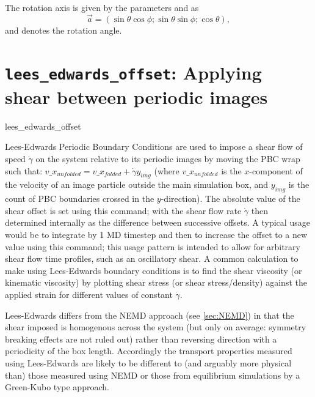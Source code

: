 The rotation axis is given by the parameters  and  as
\begin{equation}
\vec{a} = (\sin \theta \cos \phi ; \sin \theta \sin \phi ; \cos \theta),
\end{equation}
and  denotes the rotation angle.


\section{\texttt{lees_edwards_offset}: Applying shear between periodic images}
\label{sec:lees-edwards}


\begin{essyntax}
   lees_edwards_offset   
  \begin{features}
  \end{features}

\end{essyntax}

Lees-Edwards Periodic Boundary Conditions are used to impose a shear flow of speed $\dot{\gamma}$ on the system relative to its periodic images by moving the PBC wrap such that:  $v\_x_{unfolded} =  v\_x_{folded} + \dot{\gamma} y_{img}$ (where $v\_x_{unfolded}$ is the $x$-component of the velocity of an image particle outside the main simulation box, and $y_{img}$ is the count of PBC boundaries crossed in the $y$-direction).  
The absolute value of the shear offset is set using this command; with the shear flow rate $\dot{\gamma}$ then determined internally as the difference between successive offsets.  
A typical usage would be to integrate by 1 {MD} timestep and then to increase the offset to a new value using this command; this usage pattern is intended to allow for arbitrary shear flow time profiles, such as an oscillatory shear.  
A common calculation to make using Lees-Edwards boundary conditions is to find the shear viscosity (or kinematic viscosity) by plotting shear stress (or shear stress/density) against the applied strain for different values of constant $\dot{\gamma}$. 

Lees-Edwards differs from the NEMD approach (see \vref{sec:NEMD}) in that the shear imposed is homogenous across the system (but only on average: symmetry breaking effects are not ruled out) rather than reversing direction with a periodicity of the box length. 
Accordingly the transport properties  measured using Lees-Edwards are likely to be different to (and arguably more physical than) those measured using NEMD or those from equilibrium simulations by a Green-Kubo type approach.

